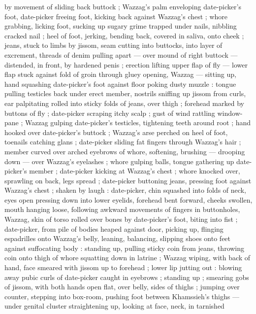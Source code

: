 by movement of sliding back buttock ; Wazzag's palm enveloping date-picker's foot, date-picker
freeing foot, kicking back against Wazzag's chest ; whore grabbing, licking foot, sucking up sugary
grime trapped under nails, nibbling cracked nail ; heel of foot, jerking, bending back, covered in
saliva, onto cheek ; jeans, stuck to limbs by jissom, seam cutting into buttocks, into layer of
excrement, threads of denim pulling apart --- over mound of right buttock --- distended, in front,
by hardened penis ; erection lifting upper flap of fly --- lower flap stuck against fold of groin
{\dashsemi} through gluey opening, Wazzag --- sitting up, hand squashing date-picker's foot against
floor {\dashcom} poking dusty muzzle : tongue pulling testicles back under erect member, nostrils
sniffing up jissom from curls, ear palpitating rolled into sticky folds of jeans, over thigh ;
forehead marked by buttons of fly ; date-picker scraping itchy scalp ; gust of wind rattling
window-pane ; Wazzag gulping date-picker's testicles, tightening teeth around root ; hand hooked
over date-picker's buttock ; Wazzag's arse perched on heel of foot, toenails catching glans ;
date-picker sliding fat fingers through Wazzag's hair ; member curved over arched eyebrows of whore,
softening, brushing --- drooping down --- over Wazzag's eyelashes ; whore gulping balls, tongue
gathering up date-picker's member ; date-picker kicking at Wazzag's chest ; whore knocked over,
sprawling on back, legs spread ; date-picker buttoning jeans, pressing foot against Wazzag's chest ;
shaken by laugh : date-picker, chin squashed into folds of neck, eyes open pressing down into lower
eyelids, forehead bent forward, cheeks swollen, mouth hanging %
loose, following awkward movements of fingers in buttonholes, Wazzag, skin of torso rolled over
bones by date-picker's foot, biting into fist ; date-picker, from pile of bodies heaped against
door, picking up, flinging espadrilles onto Wazzag's belly, leaning, balancing, slipping shoes onto
feet against suffocating body : standing up, pulling sticky coin from jeans, throwing coin onto
thigh of whore {\dashsemi} squatting down in latrine ; Wazzag wiping, with back of hand, face
smeared with jissom up to forehead ; lower lip jutting out : blowing away pubic curls of date-picker
caught in eyebrows ; standing up ; smearing gobs of jissom, with both hands open flat, over belly,
sides of thighs ; jumping over counter, stepping into box-room, pushing foot between Khamssieh's
thighs --- under genital cluster {\dashcom} straightening up, looking at face, neck, in tarnished
